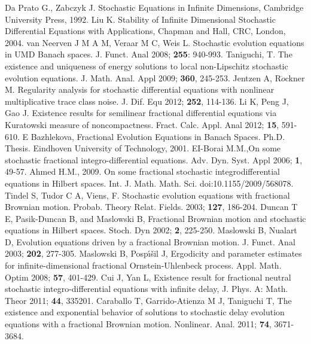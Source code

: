 \documentclass[12pt,a4paper,oneside,reqno,notitlepage]{amsart}
\theoremstyle{plain}
\numberwithin{equation}{section}
\begin{document}
\begin{thebibliography}{99}
 Da Prato G., Zabczyk J. Stochastic Equations in Infinite Dimensions, Cambridge University Press, 1992.
 Liu K. Stability of Infinite Dimensional Stochastic Differential Equations with Applications, Chapman and Hall, CRC, London, 2004.
 van Neerven J M A M, Veraar M C,  Weis L. Stochastic evolution equations in UMD Banach spaces. J. Funct. Anal 2008; \textbf{255}: 940-993.
  Taniguchi, T. The existence and uniqueness of energy solutions to local non-Lipschitz stochastic evolution equations. J. Math. Anal. Appl 2009; \textbf{360}, 245-253.
 Jentzen A, R$\ddot{o}$ckner M. Regularity analysis for stochastic differential equations with nonlinear multiplicative trace class noise. J. Dif. Equ 2012;  \textbf{252}, 114-136.
 Li K, Peng J, Gao J. Existence results for semilinear fractional differential equations via Kuratowski measure of noncompactness. Fract. Calc. Appl. Anal 2012; \textbf{15}, 591-610.
 E Bazhlekova, Fractional Evolution Equations in Banach
Spaces. Ph.D. Thesis. Eindhoven University of Technology, 2001.
 EI-Borai M.M.,On some stochastic fractional integro-differential equations. Adv. Dyn. Syst. Appl 2006; \textbf{1}, 49-57.
 Ahmed H.M., 2009.  On some fractional stochastic integrodifferential equations in Hilbert spaces. Int. J. Math. Math. Sci. doi:10.1155/2009/568078.
 Tindel S, Tudor C A,  Viens, F. Stochastic evolution equations with fractional Brownian motion.  Probab. Theory Relat. Fields. 2003; \textbf{127}, 186-204.
 Duncan T E, Pasik-Duncan B, and Maslowski B, Fractional Brownian motion and stochastic equations in Hilbert spaces.  Stoch. Dyn 2002; \textbf{2}, 225-250.
 Maslowski B, Nualart D, Evolution equations driven by a fractional Brownian motion. J. Funct. Anal 2003; \textbf{202}, 277-305.
 Maslowski B, Posp\'{\i}\v{s}il J, Ergodicity and parameter estimates for infinite-dimensional fractional Ornstein-Uhlenbeck process.  Appl. Math. Optim 2008;  \textbf{57}, 401-429.
 Cui J, Yan L, Existence result for fractional neutral stochastic
integro-differential equations with infinite delay, J. Phys. A: Math. Theor 2011; \textbf{44}, 335201.
 Caraballo T, Garrido-Atienza M J, Taniguchi T, The existence and exponential behavior of solutions to stochastic delay evolution equations with a fractional Brownian motion. Nonlinear. Anal. 2011; \textbf{74}, 3671-3684.

\end{thebibliography}
\end{document}
